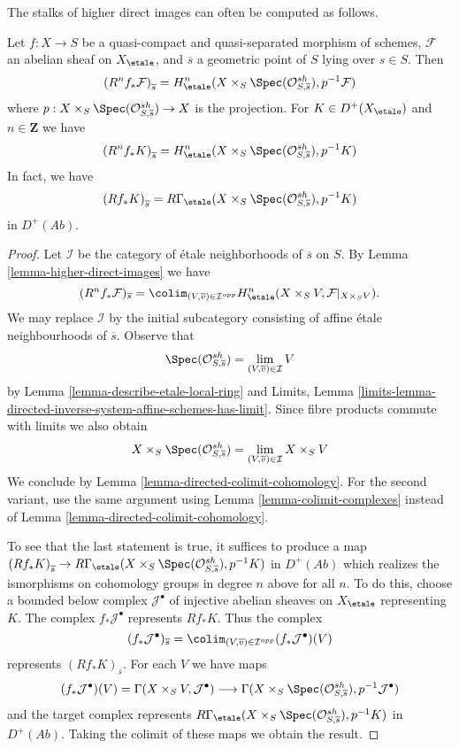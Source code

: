 \noindent
The stalks of higher direct images can often be computed as follows.

\begin{theorem}
\label{theorem-higher-direct-images}
Let $f: X \to S$ be a quasi-compact and quasi-separated morphism of schemes,
$\mathcal{F}$ an abelian sheaf on $X_\etale$, and $\overline{s}$ a
geometric point of $S$ lying over $s \in S$. Then
$$
\left(R^nf_* \mathcal{F}\right)_{\overline{s}} =
H_\etale^n( X \times_S \Spec(\mathcal{O}_{S, \overline{s}}^{sh}),
p^{-1}\mathcal{F})
$$
where $p : X \times_S \Spec(\mathcal{O}_{S, \overline{s}}^{sh}) \to X$
is the projection. For $K \in D^+(X_\etale)$ and $n \in \mathbf{Z}$
we have
$$
\left(R^nf_*K\right)_{\overline{s}} =
H_\etale^n(X \times_S \Spec(\mathcal{O}_{S, \overline{s}}^{sh}), p^{-1}K)
$$
In fact, we have
$$
\left(Rf_*K\right)_{\overline{s}}
=
R\Gamma_\etale(X \times_S \Spec(\mathcal{O}_{S, \overline{s}}^{sh}), p^{-1}K)
$$
in $D^+(\textit{Ab})$.
\end{theorem}

\begin{proof}
Let $\mathcal{I}$ be the category of \'etale neighborhoods of $\overline{s}$
on $S$. By Lemma \ref{lemma-higher-direct-images}
we have
$$
(R^nf_*\mathcal{F})_{\overline{s}} =
\colim_{(V, \overline{v}) \in \mathcal{I}^{opp}}
H_\etale^n(X \times_S V, \mathcal{F}|_{X \times_S V}).
$$
We may replace $\mathcal{I}$ by the initial subcategory consisting
of affine \'etale neighbourhoods of $\overline{s}$. Observe that
$$
\Spec(\mathcal{O}_{S, \overline{s}}^{sh}) =
\lim_{(V, \overline{v}) \in \mathcal{I}} V
$$
by Lemma \ref{lemma-describe-etale-local-ring} and
Limits, Lemma
\ref{limits-lemma-directed-inverse-system-affine-schemes-has-limit}.
Since fibre products commute with limits we also obtain
$$
X \times_S \Spec(\mathcal{O}_{S, \overline{s}}^{sh}) =
\lim_{(V, \overline{v}) \in \mathcal{I}} X \times_S V
$$
We conclude by Lemma \ref{lemma-directed-colimit-cohomology}.
For the second variant, use the same argument using
Lemma \ref{lemma-colimit-complexes} instead of
Lemma \ref{lemma-directed-colimit-cohomology}.

\medskip\noindent
To see that the last statement is true, it suffices to produce a map
$\left(Rf_*K\right)_{\overline{s}} \to
R\Gamma_\etale(X \times_S \Spec(\mathcal{O}_{S, \overline{s}}^{sh}), p^{-1}K)$
in $D^+(\textit{Ab})$ which realizes the ismorphisms on cohomology
groups in degree $n$ above for all $n$. To do this, choose a
bounded below complex $\mathcal{J}^\bullet$ of injective abelian
sheaves on $X_\etale$ representing $K$. The complex
$f_*\mathcal{J}^\bullet$ represents $Rf_*K$. Thus the complex
$$
(f_*\mathcal{J}^\bullet)_{\overline{s}} =
\colim_{(V, \overline{v}) \in \mathcal{I}^{opp}}
(f_*\mathcal{J}^\bullet)(V)
$$
represents $(Rf_*K)_{\overline{s}}$. For each $V$ we have maps
$$
(f_*\mathcal{J}^\bullet)(V) =
\Gamma(X \times_S V, \mathcal{J}^\bullet)
\longrightarrow
\Gamma(X \times_S \Spec(\mathcal{O}_{S, \overline{s}}^{sh}),
p^{-1}\mathcal{J}^\bullet)
$$
and the target complex represents
$R\Gamma_\etale(X \times_S \Spec(\mathcal{O}_{S, \overline{s}}^{sh}), p^{-1}K)$
in $D^+(\textit{Ab})$.
Taking the colimit of these maps we obtain the result.
\end{proof}

